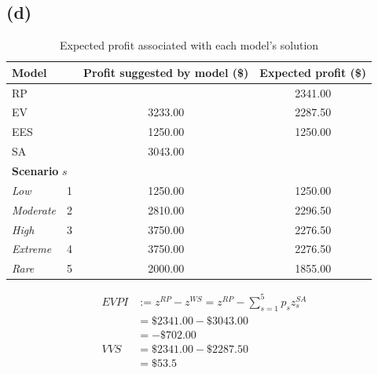 \documentclass[7pt]{article}
\begin{document}
\subsection*{(d)}
\begin{table}[h!]
    \centering
    \footnotesize
    \caption{\small{Expected profit associated with each model’s solution}}
    \begin{tabular}{ll|c|c}
        \toprule
        \textbf{Model}    &   & \textbf{Profit suggested by model (\$)} & \textbf{Expected profit (\$)} \\
        \midrule
        RP                &   &                                         & 2341.00                       \\
        EV                &   & 3233.00                                 & 2287.50                       \\
        EES               &   & 1250.00                                 & 1250.00                       \\
        SA                &   & 3043.00                                 &                               \\
        \midrule
        \multicolumn{4}{l}{\textbf{Scenario }$s$}                                                       \\
        \midrule
        \textit{Low}      & 1 & 1250.00                                 & 1250.00                       \\
        \textit{Moderate} & 2 & 2810.00                                 & 2296.50                       \\
        \textit{High}     & 3 & 3750.00                                 & 2276.50                       \\
        \textit{Extreme}  & 4 & 3750.00                                 & 2276.50                       \\
        \textit{Rare}     & 5 & 2000.00                                 & 1855.00                       \\
        \bottomrule
    \end{tabular}
\end{table}
\vspace{-2em}
\begin{align*}
    EVPI & := z^{RP} - z^{WS} = z^{RP} - \sum_{s=1}^{5} p_s z_s^{SA} \\
         & = \$2341.00 - \$3043.00                                   \\
         & = -\$702.00                                               \\
    VVS  & = \$2341.00 - \$2287.50                                   \\
         & = \$53.5
\end{align*}
\end{document}
